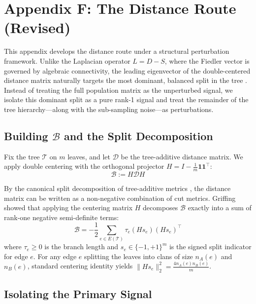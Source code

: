 \section{Appendix F: The Distance Route (Revised)}
\label{sec:appendix_f}

This appendix develops the distance route under a structural perturbation framework. Unlike the Laplacian operator $L = D-S$, where the Fiedler vector is governed by algebraic connectivity, the leading eigenvector of the double-centered distance matrix naturally targets the most dominant, balanced split in the tree \cite{griffing2012connections}. Instead of treating the full population matrix as the unperturbed signal, we isolate this dominant split as a pure rank-1 signal and treat the remainder of the tree hierarchy---along with the sub-sampling noise---as perturbations.

\subsection{Building $\mathcal{B}$ and the Split Decomposition}

Fix the tree $\mathcal{T}$ on $m$ leaves, and let $\mathcal{D}$ be the tree-additive distance matrix. We apply double centering with the orthogonal projector $H = I - \frac{1}{m}\mathbf{1}\mathbf{1}^\top$:
\begin{equation}
\mathcal{B} := H \mathcal{D} H
\end{equation}

By the canonical split decomposition of tree-additive metrics \cite{bandeltdress1992canonical}, the distance matrix can be written as a non-negative combination of cut metrics. Griffing \cite{griffing2012connections} showed that applying the centering matrix $H$ decomposes $\mathcal{B}$ exactly into a sum of rank-one negative semi-definite terms:
\begin{equation}
\label{eq:bandelt_dress_B}
\mathcal{B} = -\frac{1}{2} \sum_{e \in E(\mathcal{T})} \tau_e (H s_e)(H s_e)^\top
\end{equation}
where $\tau_e \ge 0$ is the branch length and $s_e \in \{-1, +1\}^m$ is the signed split indicator for edge $e$. For any edge $e$ splitting the leaves into clans of size $n_A(e)$ and $n_B(e)$, standard centering identity yields $\|H s_e\|_2^2 = \frac{4 n_A(e) n_B(e)}{m}$.

\subsection{Isolating the Primary Signal}

